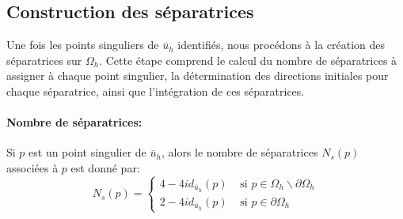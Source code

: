 \subsection{Construction des séparatrices}

Une fois les points singuliers de $\bar{u}_h$ identifiés, nous procédons à la création des séparatrices sur $\Omega_h$. Cette étape comprend le calcul du nombre de séparatrices à assigner à chaque point singulier, la détermination des directions initiales pour chaque séparatrice, ainsi que l'intégration de ces séparatrices.

\paragraph{Nombre de séparatrices:} Si $p$ est un point singulier de $\bar{u}_h$, alors le nombre de séparatrices $N_s(p)$ associées à $p$ est donné par:
\begin{equation}
    N_s(p) = 
    \left\{
    \begin{array}{ll}
    4-4id_{\bar{u}_h}(p) & \mbox{ si } p\in\Omega_h\backslash\partial\Omega_h\\[0.3cm]
    2-4id_{\bar{u}_h}(p) & \mbox{ si } p\in\partial\Omega_h
    \end{array}
    \right.
\end{equation}

